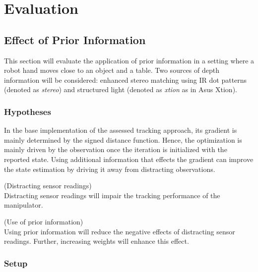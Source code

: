\chapter{Evaluation}

\section{Effect of Prior Information}

This section will evaluate the application of prior information in a setting where a robot hand moves close to an object and a table. Two sources of depth information will be considered: enhanced stereo matching using IR dot patterns (denoted as \emph{stereo}) and structured light (denoted as \emph{xtion} as in Asus Xtion).

\subsection{Hypotheses}

In the base implementation of the assessed tracking approach, its gradient is mainly determined by the signed distance function. Hence, the optimization is mainly driven by the observation once the iteration is initialized with the reported state. Using additional information that effects the gradient can improve the state estimation by driving it away from distracting observations.


\begin{hypothesis}(Distracting sensor readings)\\
Distracting sensor readings will impair the tracking performance of the manipulator.
\end{hypothesis}

\begin{hypothesis}(Use of prior information)\\
Using prior information will reduce the negative effects of distracting sensor readings. Further, increasing weights will enhance this effect.
\end{hypothesis}


\subsection{Setup}


